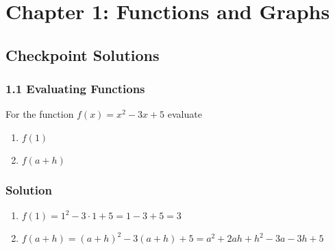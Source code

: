 \documentclass{article}
\begin{document}
\section*{Chapter 1: Functions and Graphs}

\subsection*{Checkpoint Solutions}

\subsubsection*{1.1 Evaluating Functions}

For the function $ f(x) = x^2 - 3x + 5 $ evaluate

\begin{enumerate}[label=(\alph*)]
  \item $ f(1) $
  \item $ f(a + h) $
\end{enumerate}

\subsubsection*{Solution}

\begin{enumerate}[label=(\alph*)]
  \item $ f(1) = 1 ^ 2 - 3 \cdot 1 + 5 = 1 - 3 + 5 = 3 $
  \item $ f(a + h) = (a + h)^2 - 3(a + h) + 5 = a^2 + 2ah + h^2 - 3a - 3h + 5 $
\end{enumerate}
\end{document}
